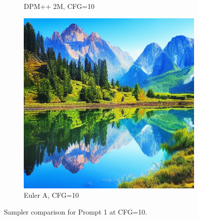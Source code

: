\documentclass[10pt,twocolumn]{article}
\begin{document}
\begin{figure}[H]
\begin{subfigure}{0.32\textwidth}
        \caption{DPM++ 2M, CFG=10}
    \end{subfigure}
    \begin{subfigure}{0.32\textwidth}
        \includegraphics[width=\linewidth]{figures/baseline_euler_a_cfg10.0_512_prompt1_20250712_093741.png}
        \caption{Euler A, CFG=10}
    \end{subfigure}
    \caption{Sampler comparison for Prompt 1 at CFG=10.}
\end{figure}
\end{document}
